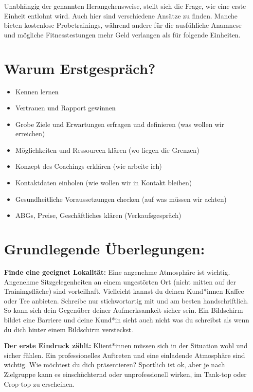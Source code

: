 \documentclass[
  letterpaper,
  DIV=11,
  numbers=noendperiod]{scrreprt}
\providecommand{\tightlist}{%
  \setlength{\itemsep}{0pt}\setlength{\parskip}{0pt}}
\begin{document}
Unabhängig der genannten Herangehensweise, stellt sich die Frage, wie
eine erste Einheit entlohnt wird. Auch hier sind verschiedene Ansätze zu
finden. Manche bieten kostenlose Probetrainings, während andere für die
ausfühliche Anamnese und mögliche Fitnesstestungen mehr Geld verlangen
als für folgende Einheiten.

\section{Warum Erstgespräch?}\label{warum-erstgespruxe4ch}

\begin{itemize}
\tightlist
\item
  Kennen lernen
\item
  Vertrauen und Rapport gewinnen
\item
  Grobe Ziele und Erwartungen erfragen und definieren (was wollen wir
  erreichen)
\item
  Möglichkeiten und Ressourcen klären (wo liegen die Grenzen)
\item
  Konzept des Coachings erklären (wie arbeite ich)
\item
  Kontaktdaten einholen (wie wollen wir in Kontakt bleiben)
\item
  Gesundheitliche Voraussetzungen checken (auf was müssen wir achten)
\item
  ABGs, Preise, Geschäftliches klären (Verkaufsgespräch)
\end{itemize}

\section{Grundlegende Überlegungen:}\label{grundlegende-uxfcberlegungen}

\textbf{Finde eine geeignet Lokalität:} Eine angenehme Atmosphäre ist
wichtig. Angenehme Sitzgelegenheiten an einem ungestörten Ort (nicht
mitten auf der Trainingsfläche) sind vorteilhaft. Vielleicht kannst du
deinen Kund*innen Kaffee oder Tee anbieten. Schreibe nur stichwortartig
mit und am besten handschriftlich. So kann sich dein Gegenüber deiner
Aufmerksamkeit sicher sein. Ein Bildschirm bildet eine Barriere und
deine Kund*in sieht auch nicht was du schreibst als wenn du dich hinter
einem Bildschirm versteckst.

\textbf{Der erste Eindruck zählt:} Klient*innen müssen sich in der
Situation wohl und sicher fühlen. Ein professionelles Auftreten und eine
einladende Atmosphäre sind wichtig. Wie möchtest du dich präsentieren?
Sportlich ist ok, aber je nach Zielgruppe kann es einschüchternd oder
unprofessionell wirken, im Tank-top oder Crop-top zu erscheinen.
\end{document}
